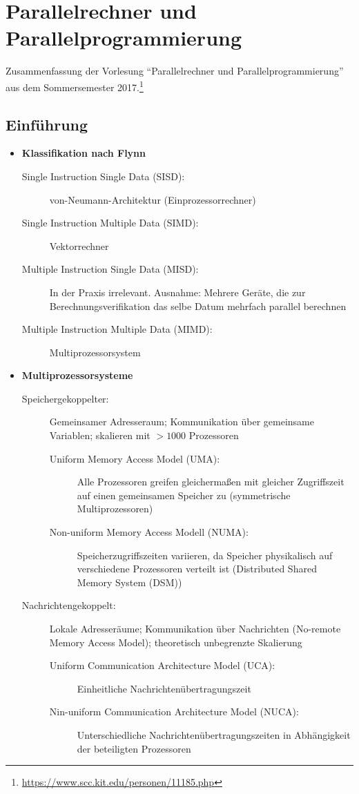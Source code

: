 \chapter{Parallelrechner und Parallelprogrammierung}

Zusammenfassung der Vorlesung "`Parallelrechner und Parallelprogrammierung"' aus dem Sommersemester 2017.\footnote{\url{https://www.scc.kit.edu/personen/11185.php}}



\section{Einführung}

\begin{itemize}
	\item \textbf{Klassifikation nach Flynn}
	\begin{description}
		\item[Single Instruction Single Data (SISD):] von-Neumann-Architektur (Einprozessorrechner)
		\item[Single Instruction Multiple Data (SIMD):] Vektorrechner
		\item[Multiple Instruction Single Data (MISD):] In der Praxis irrelevant. Ausnahme: Mehrere Geräte, die zur Berechnungsverifikation das selbe Datum mehrfach parallel berechnen
		\item[Multiple Instruction Multiple Data (MIMD):] Multiprozessorsystem
	\end{description}
	\item \textbf{Multiprozessorsysteme}
	\begin{description}
		\item[Speichergekoppelter:] Gemeinsamer Adresseraum; Kommunikation über gemeinsame Variablen; skalieren mit \(>1000\) Prozessoren
		\begin{description}
			\item[Uniform Memory Access Model (UMA):] Alle Prozessoren greifen gleichermaßen mit gleicher Zugriffszeit auf einen gemeinsamen Speicher zu (symmetrische Multiprozessoren)
			\item[Non-uniform Memory Access Modell (NUMA):] Speicherzugriffszeiten variieren, da Speicher physikalisch auf verschiedene Prozessoren verteilt ist (Distributed Shared Memory System (DSM))
		\end{description}
		\item[Nachrichtengekoppelt:] Lokale Adresseräume; Kommunikation über Nachrichten (No-remote Memory Access Model); theoretisch unbegrenzte Skalierung
		\begin{description}
			\item[Uniform Communication Architecture Model (UCA):] Einheitliche Nachrichtenübertragungszeit
			\item[Nin-uniform Communication Architecture Model (NUCA):] Unterschiedliche Nachrichtenübertragungszeiten in Abhängigkeit der beteiligten Prozessoren
		\end{description}
	\end{description}
\end{itemize}



